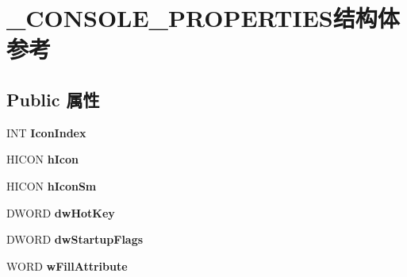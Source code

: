\hypertarget{struct___c_o_n_s_o_l_e___p_r_o_p_e_r_t_i_e_s}{}\section{\+\_\+\+C\+O\+N\+S\+O\+L\+E\+\_\+\+P\+R\+O\+P\+E\+R\+T\+I\+E\+S结构体 参考}
\label{struct___c_o_n_s_o_l_e___p_r_o_p_e_r_t_i_e_s}
\subsection*{Public 属性}
\begin{DoxyCompactItemize}
\item 
\mbox{\label{struct___c_o_n_s_o_l_e___p_r_o_p_e_r_t_i_e_s_a840121936142bdf64693b85fa9cc974e}} 
I\+NT {\bfseries Icon\+Index}
\item 
\mbox{\label{struct___c_o_n_s_o_l_e___p_r_o_p_e_r_t_i_e_s_a0fef660ff39de721424e35f7e1e5fa95}} 
H\+I\+C\+ON {\bfseries h\+Icon}
\item 
\mbox{\label{struct___c_o_n_s_o_l_e___p_r_o_p_e_r_t_i_e_s_af04bc9a418f1a4f7e630d950804276b4}} 
H\+I\+C\+ON {\bfseries h\+Icon\+Sm}
\item 
\mbox{\label{struct___c_o_n_s_o_l_e___p_r_o_p_e_r_t_i_e_s_aafaed2c13bde680534c503e03fd60d3f}} 
D\+W\+O\+RD {\bfseries dw\+Hot\+Key}
\item 
\mbox{\label{struct___c_o_n_s_o_l_e___p_r_o_p_e_r_t_i_e_s_ada5ce0eb74193fddec8af8ec3934fd79}} 
D\+W\+O\+RD {\bfseries dw\+Startup\+Flags}
\item 
\mbox{\label{struct___c_o_n_s_o_l_e___p_r_o_p_e_r_t_i_e_s_a36ac22dfbfcea7f2ea9038d6abf04c76}} 
W\+O\+RD {\bfseries w\+Fill\+Attribute}
\item 
\mbox{\label{struct___c_o_n_s_o_l_e___p_r_o_p_e_r_t_i_e_s_a28a7a67fa62f4011049e0030116f1e7b}} 

\end{DoxyCompactItemize}
